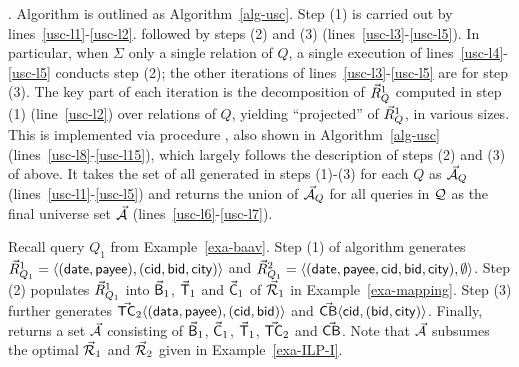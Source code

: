 \vspace{0.36ex}
.
Algorithm \usc is outlined as Algorithm~\ref{alg-usc}.
Step (1) is carried out by lines~\ref{usc-l1}-\ref{usc-l2}.
followed by
  steps (2) and (3) (lines~\ref{usc-l3}-\ref{usc-l5}).
In particular, when $\Sigma$ 
only a single relation of $Q$, a single execution
  of lines~\ref{usc-l4}-\ref{usc-l5} conducts step (2);
the other iterations of lines~\ref{usc-l3}-\ref{usc-l5} are for 
step (3). The key part of each iteration is the decomposition of
$\vec{R}_{Q}^{1}$ computed in step (1) (line~\ref{usc-l2}) over
relations of $Q$, yielding ``projected'' \bss of
$\vec{R}_{Q}^{1}$, in various sizes. This is implemented via
procedure \decompose, also shown
in Algorithm~\ref{alg-usc} (lines~\ref{usc-l8}-\ref{usc-l15}), which
largely follows the description of steps (2) and (3) of above.
It takes the set of all \bss generated in steps (1)-(3) for
each $Q$ as $\vec{{\mathcal A}}_{Q}$ (lines~\ref{usc-l1}-\ref{usc-l5}) and
returns the union of $\vec{{\mathcal A}}_{Q}$ for all queries in $\mathcal Q$ as the
final universe set $\vec{{\mathcal A}}$ (lines~\ref{usc-l6}-\ref{usc-l7}).


\begin{example}\label{exa-usc}
Recall query $Q_{1}$ from Example~\ref{exa-baav}.
Step (1) of algorithm \usc generates $\vec{R}_{Q_{1}}^{1} \allowbreak =\allowbreak
\langle (\protect\mathsf{date}, \allowbreak \protect\mathsf{payee}),\allowbreak (\protect\mathsf{cid}, \allowbreak \protect\mathsf{bid},
  \allowbreak \protect\mathsf{city})\rangle$ and 
$\vec{R}_{Q_{1}}^{2} = \langle (\protect\mathsf{date}, \allowbreak \protect\mathsf{payee},
  \protect\mathsf{cid}, \allowbreak \protect\mathsf{bid}, \allowbreak \protect\mathsf{city}),\allowbreak \emptyset\rangle$. 
Step (2) %
populates $\vec{R}_{Q_{1}}^{1}$ into 
$\vec{\protect\mathsf{B}}_{1}$, $\vec{\protect\mathsf{T}}_{1}$ and $\vec{\protect\mathsf{C}}_{1}$ of
$\vec{{\mathcal R}}_{1}$ in Example~\ref{exa-mapping}.
Step (3) further generates $\vec{\protect\mathsf{TC}}_{2}\langle (\protect\mathsf{data},\allowbreak
  \protect\mathsf{payee}),\allowbreak (\protect\mathsf{cid},\allowbreak \protect\mathsf{bid})\rangle$ and 
$\vec{\protect\mathsf{CB}}\langle \protect\mathsf{cid},\allowbreak (\protect\mathsf{bid},\allowbreak \protect\mathsf{city})\rangle$.
Finally, \opts returns a set $\vec{{\mathcal A}}$ consisting of 
$\vec{\protect\mathsf{B}}_{1}$, $\vec{\protect\mathsf{C}}_{1}$, $\vec{\protect\mathsf{T}}_{1}$,
$\vec{\protect\mathsf{TC}}_{2}$ and $\vec{\protect\mathsf{CB}}$.
Note that $\vec{{\mathcal A}}$ subsumes the optimal \bds $\vec{{\mathcal R}}_{1}$ and
$\vec{{\mathcal R}}_{2}$ given in Example~\ref{exa-ILP-I}.
\end{example}

\vspace{-0.7ex}


